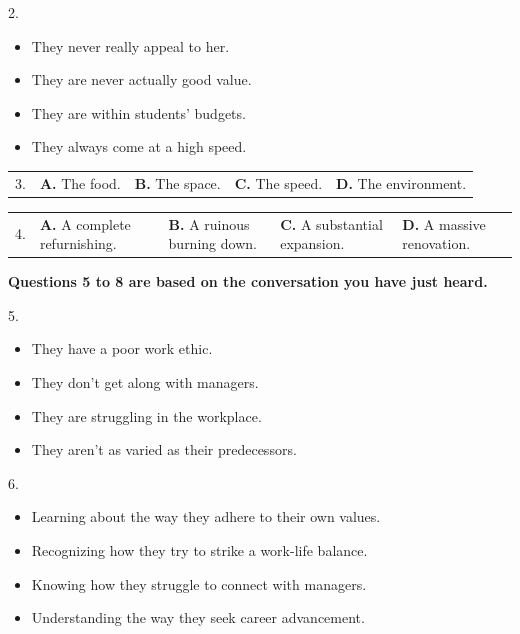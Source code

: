 \documentclass[UTF8,11pt]{ctexart}
\begin{document}
2.


\begin{itemize}[leftmargin=2em,itemsep=.2em,topsep=.4em]\item[A.] They never really appeal to her.
\item[B.] They are never actually good value.
\item[C.] They are within students’ budgets.
\item[D.] They always come at a high speed.
\end{itemize}

\noindent\begin{tabularx}{\linewidth}{@{}lXXXX@{}}3. & \textbf{A.} The food. & \textbf{B.} The space. & \textbf{C.} The speed. & \textbf{D.} The environment.\\\end{tabularx}\par

\noindent\begin{tabularx}{\linewidth}{@{}lXXXX@{}}4. & \textbf{A.} A complete refurnishing. & \textbf{B.} A ruinous burning down. & \textbf{C.} A substantial expansion. & \textbf{D.} A massive renovation.\\\end{tabularx}\par

\textbf{Questions 5 to 8 are based on the conversation you have just heard.}


5.


\begin{itemize}[leftmargin=2em,itemsep=.2em,topsep=.4em]\item[A.] They have a poor work ethic.
\item[B.] They don’t get along with managers.
\item[C.] They are struggling in the workplace.
\item[D.] They aren’t as varied as their predecessors.
\end{itemize}

6.


\begin{itemize}[leftmargin=2em,itemsep=.2em,topsep=.4em]\item[A.] Learning about the way they adhere to their own values.
\item[B.] Recognizing how they try to strike a work-life balance.
\item[C.] Knowing how they struggle to connect with managers.
\item[D.] Understanding the way they seek career advancement.
\end{itemize}
\end{document}
